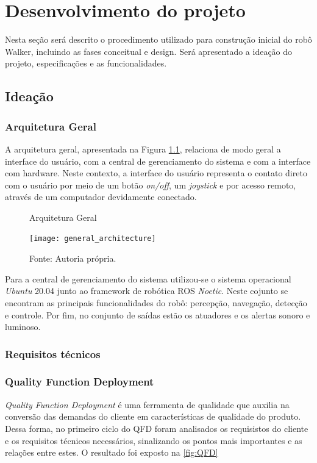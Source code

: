 \chapter{Desenvolvimento do projeto}
Nesta seção será descrito o procedimento utilizado para construção inicial do robô Walker, incluindo as fases conceitual e design.  Será apresentado a ideação do projeto, especificações e as funcionalidades.

\section{Ideação}

\subsection{Arquitetura Geral}
 A arquitetura geral, apresentada na Figura \ref{fig:Arquitetura geral}, relaciona de modo geral a interface do usuário, com a central de gerenciamento do sistema e com a interface com hardware. Neste contexto, a interface do usuário representa o contato direto com o usuário por meio de um botão \textit{on/off}, um \textit{joystick} e por acesso remoto, através de um computador devidamente conectado.

 \begin{figure} [h!]	
    \centering

    \caption{Arquitetura Geral}
    \texttt{[image: general\_architecture]}
    \caption*{Fonte: Autoria própria.}
    \label{fig:Arquitetura geral}
\end{figure}	

Para a central de gerenciamento do sistema utilizou-se o sistema operacional \textit{Ubuntu} 20.04 junto ao framework de robótica ROS \textit{Noetic}. Neste cojunto se encontram as principais funcionalidades do robô: percepção, navegação, detecção e controle. Por fim, no conjunto de saídas estão os atuadores e os alertas sonoro e luminoso.

\subsection{Requisitos técnicos}

\subsection{Quality Function Deployment}
\textit{Quality Function Deployment} é uma ferramenta de qualidade que auxilia na conversão das demandas do cliente em características de qualidade do produto. Dessa forma, no primeiro ciclo do QFD foram analisados os requisistos do cliente e os requisitos técnicos necessários, sinalizando os pontos mais importantes e as relações entre estes. O resultado foi exposto na \ref{fig:QFD}

